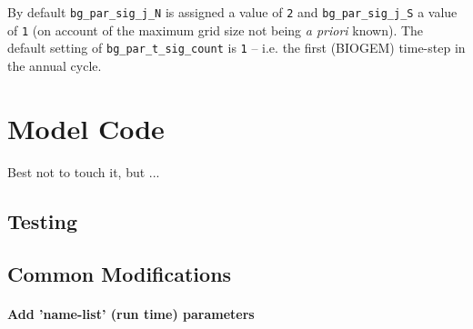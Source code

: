 \documentclass[11pt,fleqn]{book} %
\begin{document}
By default \texttt{bg\_par\_sig\_j\_N} is assigned a value of \texttt{2} and \texttt{bg\_par\_sig\_j\_S} a value of \texttt{1} (on account of the maximum grid size not being \textit{a priori} known).
The default setting of \texttt{bg\_par\_t\_sig\_count} is \texttt{1} -- i.e. the first (BIOGEM) time-step in the annual cycle.


\cleardoublepage


\chapter{Model Code}\label{ch:model-code}

\hfill \break

Best not to touch it, but ...


\newpage

%
\section{Testing}

%
%

\newpage

%
\section{Common Modifications}

%
\subsubsection{Add 'name-list' (run time) parameters}
\end{document}
